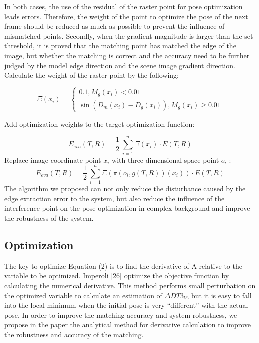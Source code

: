 \documentclass{cta-author}
\begin{document}
  In both cases, the use of the residual of the raster point for pose optimization leads errors. Therefore, the weight of the point to optimize the pose of the next frame should be reduced as much as possible to prevent the influence of mismatched points. Secondly, when the gradient magnitude is larger than the set threshold, it is proved that the matching point has matched the edge of the image, but whether the matching is correct and the accuracy need to be further judged by the model edge direction and the scene image gradient direction. Calculate the weight of the raster point by the following:

\begin{equation}\label{eq21}
  \Xi(x_i)=\begin{cases}
    0.1 , M_g(x_i)<0.01\\
    \sin(D_m(x_i)-D_g(x_i)),M_g(x_i)\geq 0.01
  \end{cases}
\end{equation}

Add optimization weights to the target optimization function:

\begin{equation}\label{eq22}
  E_{eva}(T,R)={\frac{1}{2}\ \sum_{i=1}^{n}\Xi(x_i)\cdot E(T,R)}
\end{equation}
Replace image coordinate point $x_i$  with three-dimensional space point $o_{i}$ :
\begin{equation}\label{eq23}
  E_{eva}(T,R)={\frac{1}{2}\ \sum_{i=1}^{n}\Xi(\pi(o_i,g(T,R))(x_i))\cdot E(T,R)}
\end{equation}
The algorithm we proposed can not only reduce the disturbance caused by the edge extraction error to the system, but also reduce the influence of the interference point on the pose optimization in complex background and improve the robustness of the system.

\subsection{Optimization}\label{sec3.4}

The key to optimize Equation (2) is to find the derivative of A relative to the variable to be optimized. Imperoli [26] optimize the objective function by calculating the numerical derivative. This method performs small perturbation on the optimized variable to calculate an estimation of $\Delta DT3_V$, but it is easy to fall into the local minimum when the initial pose is very “different” with the actual pose. In order to improve the matching accuracy and system robustness, we propose in the paper the analytical method for derivative calculation to improve the robustness and accuracy of the matching. 
\end{document}
